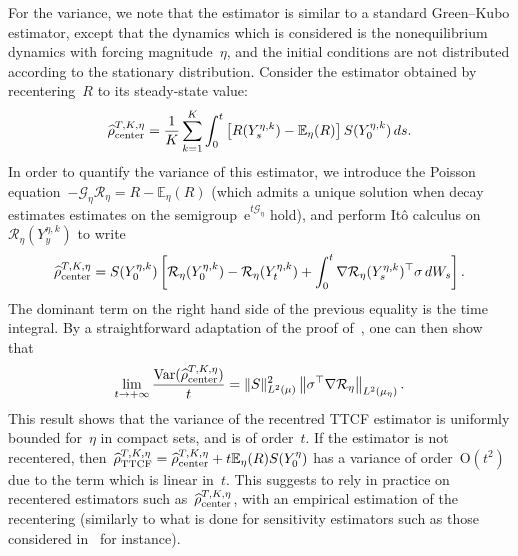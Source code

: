 \documentclass[11pt]{article}
\newcommand{\E}{\mathbb{E}}
\newcommand{\e}{\mathrm{e}}
\DeclareMathOperator{\Var}{Var}
\theoremstyle{definition}
\newcommand{\G}{\mathcal{G}}
\newcommand{\TestTTCF}{\estTmp^{T,K,\eta}_{\rm TTCF}}
\newcommand{\TestTTCFcenter}{\estTmp^{T,K,\eta}_{\rm center}}
\newcommand{\estTmp}{\widehat{\rho}}
\begin{document}
For the variance, we note that the estimator is similar to a standard Green--Kubo estimator, except that the dynamics which is considered is the nonequilibrium dynamics with forcing magnitude~$\eta$, and the initial conditions are not distributed according to the stationary distribution. Consider the estimator obtained by recentering~$R$ to its steady-state value:
\[
\TestTTCFcenter = \frac1K \sum_{k=1}^K \int_0^t \left[R(Y_s^{\eta,k}) - \E_\eta(R)\right] S(Y_0^{\eta,k}) \, ds.
\]
In order to quantify the variance of this estimator, we introduce the Poisson equation~$-\G_\eta \mathcal{R}_\eta = R - \E_\eta(R)$ (which admits a unique solution when decay estimates estimates on the semigroup~$\e^{t\G_\eta}$ hold), and perform It\^o calculus on~$\mathcal{R}_\eta(Y_y^{\eta,k})$ to write
\[
\TestTTCFcenter = S(Y_0^{\eta,k})\left[\mathcal{R}_\eta(Y_0^{\eta,k}) - \mathcal{R}_\eta(Y_t^{\eta,k}) + \int_0^t \nabla \mathcal{R}_\eta(Y_s^{\eta,k})^\top \sigma \, dW_s \right].
\]
The dominant term on the right hand side of the previous equality is the time integral. By a straightforward adaptation of the proof of~\cite[Proposition~2.3]{pavliotis2024}, one can then show that
\begin{equation}
  \label{eq:asymptotic_variance_TTCF}
  \lim_{t \to +\infty} \frac{\Var(\TestTTCFcenter)}{t} = \|S\|^2_{L^2(\mu)} \left\|\sigma^\top \nabla\mathcal{R}_\eta\right\|_{L^2(\mu_\eta)}.
\end{equation}
This result shows that the variance of the recentred TTCF estimator is uniformly bounded for~$\eta$ in compact sets, and is of order~$t$. If the estimator is not recentered, then~$\TestTTCF = \TestTTCFcenter + t \E_\eta(R) S(Y_0^\eta)$ has a variance of order~$\mathrm{O}(t^2)$ due to the term which is linear in~$t$. This suggests to rely in practice on recentered estimators such as~$\TestTTCFcenter$, with an empirical estimation of the recentering (similarly to what is done for sensitivity estimators such as those considered in~\cite{plechac2021} for instance).
\end{document}
